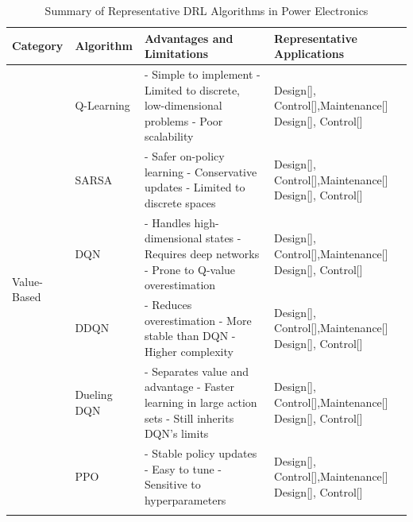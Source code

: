 \begin{table}[t]
\centering
\caption{Summary of Representative DRL Algorithms in Power Electronics}
\label{tab:drltable}
\renewcommand{\arraystretch}{1.2}
\begin{tabular}{|l|l|p{8.2cm}|p{4.2cm}|}
\hline
\textbf{Category} & \textbf{Algorithm} & \textbf{Advantages and Limitations} & \textbf{Representative Applications} \\
\hline

\multirow{8}{*}{Value-Based}
& Q-Learning & 
- Simple to implement \newline
- Limited to discrete, low-dimensional problems \newline
- Poor scalability 
& Design[], Control[],Maintenance[] \newline
Design[], Control[]
\\
\cline{2-4}

& SARSA & 
- Safer on-policy learning \newline
- Conservative updates \newline
- Limited to discrete spaces 
& Design[], Control[],Maintenance[] \newline
Design[], Control[]
\\
\cline{2-4}

& DQN & 
- Handles high-dimensional states \newline
- Requires deep networks \newline
- Prone to Q-value overestimation 
& Design[], Control[],Maintenance[] \newline
Design[], Control[]
\\
\cline{2-4}

& DDQN & 
- Reduces overestimation \newline
- More stable than DQN \newline
- Higher complexity 
& Design[], Control[],Maintenance[] \newline
Design[], Control[]
\\
\cline{2-4}

& Dueling DQN & 
- Separates value and advantage \newline
- Faster learning in large action sets \newline
- Still inherits DQN's limits 
& Design[], Control[],Maintenance[] \newline
Design[], Control[]
\\
\cline{2-4}

\multirow{4}{*}{Policy-Based}

& PPO & 
- Stable policy updates \newline
- Easy to tune \newline
- Sensitive to hyperparameters 
& Design[], Control[],Maintenance[] \newline
Design[], Control[]
\\
\cline{2-4}


\end{tabular}
\end{table}
